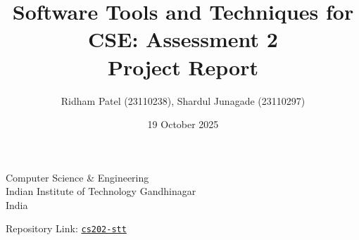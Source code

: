 \documentclass{article}
\title{Software Tools and Techniques for CSE: Assessment 2 \\[1ex] \large Project Report}
\author{Ridham Patel (23110238), Shardul Junagade (23110297)}
\date{19 October 2025}
\begin{document}
\maketitle

\begin{center}
    Computer Science \& Engineering\\
    Indian Institute of Technology Gandhinagar\\
    India

    \vspace{0.8cm}

\end{center}

\begin{center}
{\large Repository Link: \href{https://github.com/ShardulJunagade/cs202-stt/}{\texttt{cs202-stt}}}
\end{center}

\tableofcontents
\pagebreak



\newpage



\end{document}
